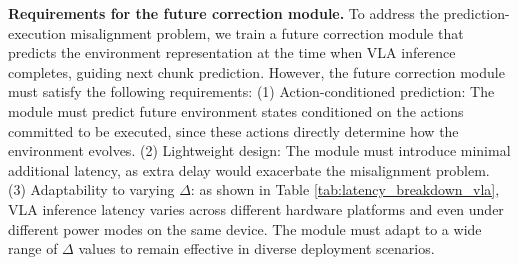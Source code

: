 \textbf{Requirements for the future correction module.}
To address the prediction-execution misalignment problem, we train a future correction module that predicts the environment representation at the time when VLA inference completes, guiding next chunk prediction. 
However, the future correction module must satisfy the following requirements: 
(1) Action-conditioned prediction: The module must predict future environment states conditioned on the actions committed to be executed, since these actions directly determine how the environment evolves.
(2) Lightweight design: The module must introduce minimal additional latency, as extra delay would exacerbate the misalignment problem.
(3) Adaptability to varying $\Delta$: as shown in Table \ref{tab:latency_breakdown_vla}, VLA inference latency varies across different hardware platforms and even under different power modes on the same device. The module must adapt to a wide range of $\Delta$ values to remain effective in diverse deployment scenarios.







